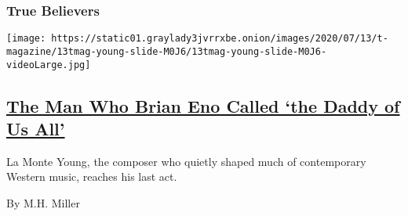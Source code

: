 \begin{enumerate}
{  \subsubsection{True Believers}\label{true-believers-8}}

  \texttt{[image: https://static01.graylady3jvrrxbe.onion/images/2020/07/13/t-magazine/13tmag-young-slide-M0J6/13tmag-young-slide-M0J6-videoLarge.jpg]}

  \hypertarget{the-man-who-brian-eno-called-the-daddy-of-us-all}{%
  \subsection{\texorpdfstring{\href{/2020/07/22/t-magazine/la-monte-young.html}{The
  Man Who Brian Eno Called `the Daddy of Us
  All'}}{The Man Who Brian Eno Called `the Daddy of Us All'}}\label{the-man-who-brian-eno-called-the-daddy-of-us-all}}

  La Monte Young, the composer who quietly shaped much of contemporary
  Western music, reaches his last act.

  By M.H. Miller
\end{enumerate}

